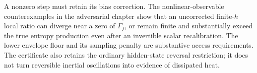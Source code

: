 A nonzero step must retain its bias correction. The nonlinear-observable
counterexamples in the adversarial chapter show that an uncorrected
finite-$h$ local ratio can diverge near a zero of $\Gamma_f$, or remain finite
and substantially exceed the true entropy production even after an invertible
scalar recalibration. The lower envelope floor and its sampling
penalty are substantive access requirements. The certificate also retains
the ordinary hidden-state reversal restriction; it does not turn reversible
inertial oscillations into evidence of dissipated heat.
